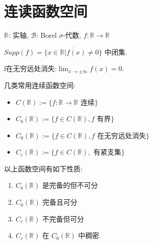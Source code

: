 \theoremstyle{plain}\newtheorem*{1}{习题1}
\theoremstyle{plain}\newtheorem*{2}{习题2}
\theoremstyle{plain}\newtheorem*{3}{习题3}
\theoremstyle{plain}\newtheorem*{4}{习题4}
\theoremstyle{plain}\newtheorem*{5}{习题5}
\theoremstyle{plain}\newtheorem*{6}{习题6}
\theoremstyle{plain}\newtheorem*{7}{习题7}
\theoremstyle{plain}\newtheorem*{8}{习题8}
\theoremstyle{plain}\newtheorem*{9}{习题9}
\theoremstyle{plain}\newtheorem*{10}{习题10}
\def\E{\mathbb{E}}
\def\R{\mathbb{R}}
\def\N{\mathbb{N}}
\def\B{\mathcal{B}}
\def\M{\mathcal{M}}
\def\prob{\mathbb{P}}
\def\t{\underline{t}}
\def\c{\underline{c}}
\newtheorem{prop}{性质}

\section{连读函数空间}

$\mathbb{R}$: 实轴, $\mathcal{B}$: Borel $\sigma$-代数, $f: \mathbb{R} \rightarrow \mathbb{R}$

$Supp(f) = \overline{\{x \in \mathbb{R} | f(x) \neq 0\}}$ 中闭集.

f在无穷远处消失:$ \lim_{x\rightarrow\pm\infty}f(x)=0.$

几类常用连续函数空间:
\begin{itemize}
    \item $C(\mathbb{R}) := \{f: \mathbb{R} \rightarrow \mathbb{R} \text{ 连续}\}$
    \item $C_{b}(\mathbb{R}) := \{f \in C(\mathbb{R}), f \text{ 有界}\}$
    \item $C_{0}(\mathbb{R}) := \{f \in C(\mathbb{R}), f \text{ 在无穷远处消失}\}$
    \item $C_{c}(\mathbb{R}) := \{f \in C(\mathbb{R}), \text{ 有紧支集}\}$
\end{itemize}
\begin{theorem}
   以上函数空间有如下性质:
   \begin{enumerate}
    \item[(1)] $C_{b}(\mathbb{R})$ 是完备的但不可分
    \item[(2)] $C_{0}(\mathbb{R})$ 完备且可分
    \item[(3)] $C_{c}(\mathbb{R})$ 不完备但可分 
    \item[(4)] $C_{c}(\mathbb{R})$ 在 $C_{0}(\mathbb{R})$ 中稠密.
   \end{enumerate}
    
\end{theorem}



